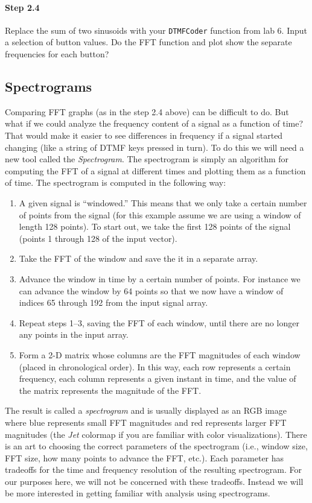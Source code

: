 \paragraph{Step 2.4} Replace the sum of two sinusoids with your
\verb|DTMFCoder| function from lab 6. Input a selection of button
values. Do the FFT function and plot show the separate frequencies for each
button?



\subsection{Spectrograms}

Comparing FFT graphs (as in the step 2.4 above) can be difficult to
do. But what if we could analyze the frequency content of a signal as
a function of time? That would make it easier to see differences in
frequency if a signal started changing (like a string of DTMF keys
pressed in turn). To do this we will need a new tool called the
\emph{Spectrogram}. The spectrogram is simply an algorithm for
computing the FFT of a signal at different times and plotting them as
a function of time. The spectrogram is computed in the following way:

\begin{enumerate}
\item A given signal is ``windowed.'' This means that we only take a
  certain number of points from the signal (for this example assume we
  are using a window of length 128 points). To start out, we take the
  first 128 points of the signal (points 1 through 128 of the input
  vector).
\item Take the FFT of the window and save the it in a separate array.
\item Advance the window in time by a certain number of points. For
  instance we can advance the window by 64 points so that we now have
  a window of indices 65 through 192 from the input signal array.
\item Repeat steps 1--3, saving the FFT of each window, until there
  are no longer any points in the input array.
\item Form a 2-D matrix whose columns are the FFT magnitudes of each
  window (placed in chronological order). In this way, each row
  represents a certain frequency, each column represents a given
  instant in time, and the value of the matrix represents the
  magnitude of the FFT.
\end{enumerate}

The result is called a \emph{spectrogram} and is usually displayed as
an RGB image where blue represents small FFT magnitudes and red
represents larger FFT magnitudes (the \emph{Jet} colormap if you are
familiar with color visualizations). There is an art to choosing the
correct parameters of the spectrogram (i.e., window size, FFT size,
how many points to advance the FFT, etc.). Each parameter has
tradeoffs for the time and frequency resolution of the resulting
spectrogram. For our purposes here, we will not be concerned with
these tradeoffs. Instead we will be more interested in getting
familiar with analysis using spectrograms.

